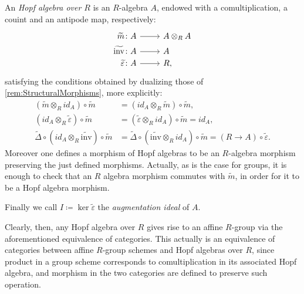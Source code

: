 \documentclass[../Main]{subfiles}
\begin{document}
\begin{defn}\label{defn:HopfAlgebra}
	An {\em Hopf algebra over $R$} is an $R$-algebra $A$,
	endowed with a comultiplication, a couint and an antipode map,
	respectively:
	\begin{equation*}
			\begin{tikzcd}[row sep = 0ex
         ,/tikz/column 1/.append style={anchor=base east}
         ,/tikz/column 2/.append style={anchor=base west}
         ,/tikz/column 3/.append style={anchor=base east}]
			\widetilde{m}\colon A \arrow[r, "", rightarrow] &
			A \otimes_R A \\
			\widetilde{\mathrm{inv}}\colon A \arrow[r, "", rightarrow] &
			A \\
			\widetilde{\varepsilon} \colon A \arrow[r, "", rightarrow] &
			R,
		\end{tikzcd}
	\end{equation*} 
	satisfying the conditions obtained by dualizing those
	of \cref{rem:StructuralMorphisms}, more explicitly:
	\begin{align*}
		( \widetilde{m} \otimes_R id_A ) \circ \widetilde{m} &=
		( id_A \otimes_R \widetilde{m} ) \circ \widetilde{m},\\
		( id_A \otimes_R \widetilde{\varepsilon} ) \circ \widetilde{m} &=
		( \widetilde{\varepsilon} \otimes_R id_A ) \circ \widetilde{m} =
		id_A,\\
		\widetilde{\Delta} \circ ( id_A \otimes_R \widetilde{\mathrm{inv}} ) 
		\circ \widetilde{m} &=
		\widetilde{\Delta} \circ ( \widetilde{\mathrm{inv}} \otimes_R id_A ) 
		\circ \widetilde{m} =
		(R \to A) \circ \widetilde{\varepsilon}
	.\end{align*} 
	Moreover one defines a morphism of Hopf algebras to be an $R$-algebra
	morphism preserving the just defined morphisms.
	Actually, as is the case for groups, it is enough to check that an $R$ algebra
	morphism commutes with $\widetilde{m}$, in order for it to be a Hopf algebra morphism.

	Finally we call $I \coloneqq \ker \widetilde{\varepsilon}$ the 
	{\em augmentation ideal} of $A$.
\end{defn}


\begin{rem}
	Clearly, then, any Hopf algebra over $R$ gives rise
	to an affine $R$-group via the aforementioned equivalence of categories.
	This actually is an equivalence of categories between affine
	$R$-group schemes and Hopf algebras over $R$, since 
	product in a group scheme corresponds to comultiplication in its 
	associated Hopf algebra, and morphism in the two categories are defined
	to preserve such operation.
\end{rem}
\end{document}

